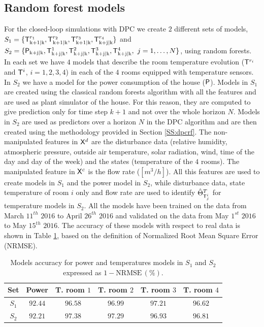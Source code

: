 \subsection{Random forest models}
\label{SS:randomForestsModels}
For the closed-loop simulations with DPC we create $2$ different sets of models, $S_1 = \{\mathsf{T}^{r_1}_{\mathrm{k+1|k}},\mathsf{T}^{r_2}_{\mathrm{k+1|k}},\mathsf{T}^{r_3}_{\mathrm{k+1|k}},\mathsf{T}^{r_4}_{\mathrm{k+j|k}}\}$ and $S_2 = \{\tP_{\mathrm{k+j|k}},\tT^{1}_{\mathrm{k+j|k}},\tT^{2}_{\mathrm{k+j|k}},\tT^{3}_{\mathrm{k+j|k}},\\\tT^{4}_{\mathrm{k+j|k}},\ j = 1,\ldots,N\}$, using random forests. In each set we have  $4$ models that describe the room temperature evolution ($\mathsf{T}^{r_i}$ and $\mathsf{T}^i$, $i=1,2,3,4$) in each of the $4$ rooms equipped with temperature sensors. In $S_2$ we have a model for the power consumption of the house ($\mathsf{P}$). Models in $S_1$ are created using the classical random forests algorithm with all the features and are used as plant simulator of the house. For this reason, they are computed to give prediction only for time step $k+1$ and not over the whole horizon $N$. Models in $S_2$ are used as predictors over a horizon $N$ in the DPC algorithm and are then created using the methodology provided in Section \ref{SS:dpcrf}. The non-manipulated features in $\mathsf{X}^d$ are the disturbance data (relative humidity, atmospheric pressure, outside air temperature, solar radiation, wind, time of the day and day of the week) and the states (temperature of the $4$ rooms). The manipulated feature in $\mathsf{X}^c$ is the flow rate ($[m^3/h]$). All this features are used to create models in $S_1$ and the power model in $S_2$, while disturbance data, state temperature of room $i$ only and flow rate are used to identify $\hat{\Theta}^{T}_{\mathsf{T}^i_j}$ for temperature models in $S_2$. All the models have been trained on the data from March $11^{th}$ $2016$ to April $26^{th}$ $2016$ and validated on the data from May $1^{st}$ $2016$ to May $15^{th}$ $2016$. The accuracy of these models with respect to real data is shown in Table \ref{T:S1accuracy}, based on the definition of Normalized Root Mean Square Error (NRMSE).

\begin{table}[t!]
	\centering
	\begin{tabular}{cccccc}
		\toprule
		Set       & Power   & T. room $1$ & T. room $2$ & T. room $3$ & T. room $4$  \\ 
		\midrule
		$S_1$     & $92.44$ & $96.58$     & $96.99$     & $97.21$     & $96.62$\\
		$S_2$     & $92.21$ & $97.38$     & $97.29$     & $96.93$     & $96.81$\\
		\bottomrule
	\end{tabular}
	\caption{Models accuracy for power and temperatures models in $S_1$ and $S_2$ expressed as $\mathrm{1-NRMSE}\,(\%)$.}
	\captionsetup{justification=centering}
	\label{T:S1accuracy}
\end{table}

